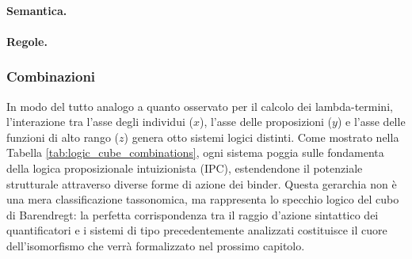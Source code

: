 \paragraph{Semantica.}


\paragraph{Regole.} \breakpara


\subsubsection{Combinazioni}
In modo del tutto analogo a quanto osservato per il calcolo dei lambda-termini, l'interazione tra l'asse degli individui ($x$), l'asse delle proposizioni ($y$) e l'asse delle funzioni di alto rango ($z$) 
genera otto sistemi logici distinti. Come mostrato nella Tabella \ref{tab:logic_cube_combinations}, ogni sistema poggia sulle fondamenta della logica proposizionale intuizionista (IPC), estendendone il potenziale 
strutturale attraverso diverse forme di azione dei binder. Questa gerarchia non è una mera classificazione tassonomica, ma rappresenta lo specchio logico del cubo di Barendregt: la perfetta corrispondenza tra il 
raggio d'azione sintattico dei quantificatori e i sistemi di tipo precedentemente analizzati costituisce il cuore dell'isomorfismo che verrà formalizzato nel prossimo capitolo.


